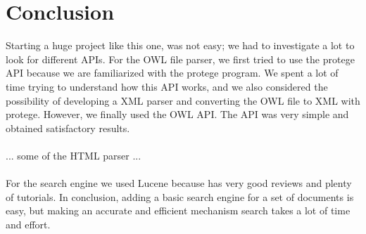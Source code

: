 \chapter{Conclusion} \label{cha:conclusion}

Starting a huge project like this one, was not easy; we had to investigate a lot
to look for different APIs.  For the OWL file parser, we first tried to use the
protege API because we are familiarized with the protege program. We spent a lot
of time trying to understand how this API works, and we also considered the
possibility of developing a XML parser and converting the OWL file to XML with
protege. However, we finally used the OWL API. The API was very simple and
obtained satisfactory results.\\
\\
... some of the HTML parser ...\\
\\
For the search engine we used Lucene because has very good reviews and plenty of
tutorials. In conclusion, adding a basic search engine for a set of documents
is easy, but making an accurate and efficient mechanism search takes a lot of
time and effort.

